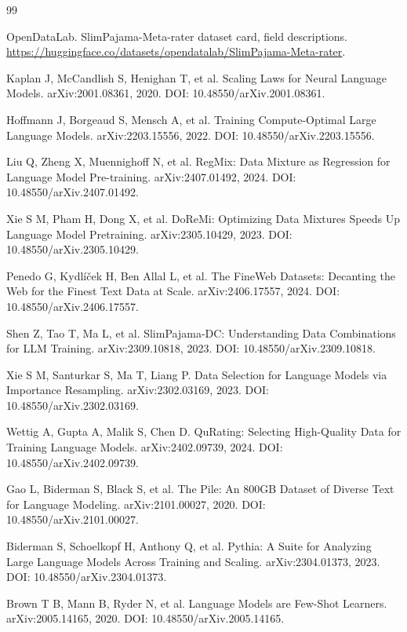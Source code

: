 \begin{thebibliography}{99}
\songti{}
\setlength{\itemsep}{0.1em}
\setlength{\parsep}{0pt}

OpenDataLab. SlimPajama-Meta-rater dataset card, field descriptions.
\url{https://huggingface.co/datasets/opendatalab/SlimPajama-Meta-rater}.

Kaplan J, McCandlish S, Henighan T, et al.
Scaling Laws for Neural Language Models.
arXiv:2001.08361, 2020. DOI: 10.48550/arXiv.2001.08361.

Hoffmann J, Borgeaud S, Mensch A, et al.
Training Compute-Optimal Large Language Models.
arXiv:2203.15556, 2022. DOI: 10.48550/arXiv.2203.15556.

Liu Q, Zheng X, Muennighoff N, et al.
RegMix: Data Mixture as Regression for Language Model Pre-training.
arXiv:2407.01492, 2024. DOI: 10.48550/arXiv.2407.01492.

Xie S M, Pham H, Dong X, et al.
DoReMi: Optimizing Data Mixtures Speeds Up Language Model Pretraining.
arXiv:2305.10429, 2023. DOI: 10.48550/arXiv.2305.10429.

Penedo G, Kydl\'i\v{c}ek H, Ben Allal L, et al.
The FineWeb Datasets: Decanting the Web for the Finest Text Data at Scale.
arXiv:2406.17557, 2024. DOI: 10.48550/arXiv.2406.17557.

Shen Z, Tao T, Ma L, et al.
SlimPajama-DC: Understanding Data Combinations for LLM Training.
arXiv:2309.10818, 2023. DOI: 10.48550/arXiv.2309.10818.

Xie S M, Santurkar S, Ma T, Liang P.
Data Selection for Language Models via Importance Resampling.
arXiv:2302.03169, 2023. DOI: 10.48550/arXiv.2302.03169.

Wettig A, Gupta A, Malik S, Chen D.
QuRating: Selecting High-Quality Data for Training Language Models.
arXiv:2402.09739, 2024. DOI: 10.48550/arXiv.2402.09739.

Gao L, Biderman S, Black S, et al.
The Pile: An 800GB Dataset of Diverse Text for Language Modeling.
arXiv:2101.00027, 2020. DOI: 10.48550/arXiv.2101.00027.

Biderman S, Schoelkopf H, Anthony Q, et al.
Pythia: A Suite for Analyzing Large Language Models Across Training and Scaling.
arXiv:2304.01373, 2023. DOI: 10.48550/arXiv.2304.01373.

Brown T B, Mann B, Ryder N, et al.
Language Models are Few-Shot Learners.
arXiv:2005.14165, 2020. DOI: 10.48550/arXiv.2005.14165.


\end{thebibliography}
